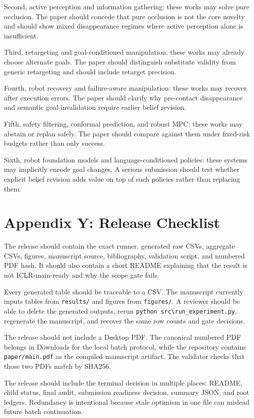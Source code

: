 \documentclass{article}
\begin{document}
Second, active perception and information gathering: these works may solve pure occlusion. The paper should concede that pure occlusion is not the core novelty and should show mixed disappearance regimes where active perception alone is insufficient.

Third, retargeting and goal-conditioned manipulation: these works may already choose alternate goals. The paper should distinguish substitute validity from generic retargeting and should include retarget precision.

Fourth, robot recovery and failure-aware manipulation: these works may recover after execution errors. The paper should clarify why pre-contact disappearance and semantic goal invalidation require earlier belief revision.

Fifth, safety filtering, conformal prediction, and robust MPC: these works may abstain or replan safely. The paper should compare against them under fixed-risk budgets rather than only success.

Sixth, robot foundation models and language-conditioned policies: these systems may implicitly encode goal changes. A serious submission should test whether explicit belief revision adds value on top of such policies rather than replacing them.

\section{Appendix Y: Release Checklist}
The release should contain the exact runner, generated raw CSVs, aggregate CSVs, figures, manuscript source, bibliography, validation script, and numbered PDF hash. It should also contain a short README explaining that the result is not ICLR-main-ready and why the scope gate fails.

Every generated table should be traceable to a CSV. The manuscript currently inputs tables from \texttt{results/} and figures from \texttt{figures/}. A reviewer should be able to delete the generated outputs, rerun \texttt{python src\textbackslash run\_experiment.py}, regenerate the manuscript, and recover the same row counts and gate decisions.

The release should not include a Desktop PDF. The canonical numbered PDF belongs in Downloads for the local batch protocol, while the repository contains \texttt{paper/main.pdf} as the compiled manuscript artifact. The validator checks that those two PDFs match by SHA256.

The release should include the terminal decision in multiple places: README, child status, final audit, submission readiness decision, summary JSON, and root ledgers. Redundancy is intentional because stale optimism in one file can mislead future batch continuation.
\end{document}

